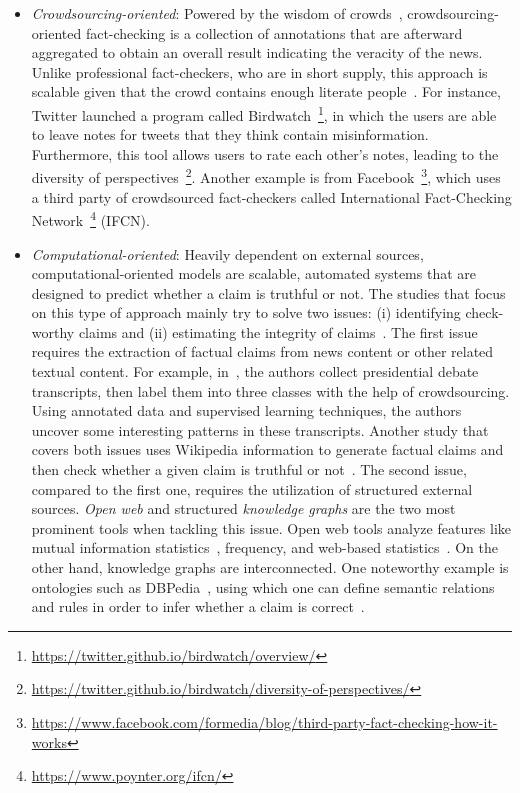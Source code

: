\begin{description}
\begin{itemize}
        \item \emph{Crowdsourcing-oriented}: Powered by the wisdom of crowds~\parencite{WisdomOfCrowds_Galton}, crowdsourcing-oriented fact-checking is a collection of annotations that are afterward aggregated to obtain an overall result indicating the veracity of the news. Unlike professional fact-checkers, who are in short supply, this approach is scalable given that the crowd contains enough literate people~\parencite{ScalingUpFactChecking_Allen}.  For instance, Twitter launched a program called Birdwatch~\footnote{\url{https://twitter.github.io/birdwatch/overview/}}, in which the users are able to leave notes for tweets that they think contain misinformation. Furthermore, this tool allows users to rate each other’s notes, leading to the diversity of perspectives~\footnote{\url{https://twitter.github.io/birdwatch/diversity-of-perspectives/}}. Another example is from Facebook~\footnote{\url{https://www.facebook.com/formedia/blog/third-party-fact-checking-how-it-works}}, which uses a third party of crowdsourced fact-checkers called International Fact-Checking Network~\footnote{\url{https://www.poynter.org/ifcn/}} (IFCN).
        \item \emph{Computational-oriented}: Heavily dependent on external sources, computational-oriented models are scalable, automated systems that are designed to predict whether a claim is truthful or not. The studies that focus on this type of approach mainly try to solve two issues: (i) identifying check-worthy claims and (ii) estimating the integrity of claims~\parencite{FakeNewsDetectionOnSocialMediaADataMiningPerspective_Shu}.  The first issue requires the extraction of factual claims from news content or other related textual content. For example, in~\parencite{DetectingCheckWorthyClaims_Hassan}, the authors collect presidential debate transcripts, then label them into three classes with the help of crowdsourcing. Using annotated data and supervised learning techniques, the authors uncover some interesting patterns in these transcripts. Another study that covers both issues uses Wikipedia information to generate factual claims and then check whether a given claim is truthful or not~\parencite{FEVER_Thorne}.  The second issue, compared to the first one, requires the utilization of structured external sources. \emph{Open web} and structured \emph{knowledge graphs} are the two most prominent tools when tackling this issue. Open web tools analyze features like mutual information statistics~\parencite{UnsupervisedNamedEntityExtraction_Etzioni}, frequency, and web-based statistics~\parencite{WebBasedStatisticalFactChecking_Magdy}.  On the other hand, knowledge graphs are interconnected. One noteworthy example is ontologies such as DBPedia~\parencite{DBPedia_Auer}, using which one can define semantic relations and rules in order to infer whether a claim is correct~\parencite{SemanticFakeNewsDetection_Bracsoveanu}.
    \end{itemize}
\end{description}

